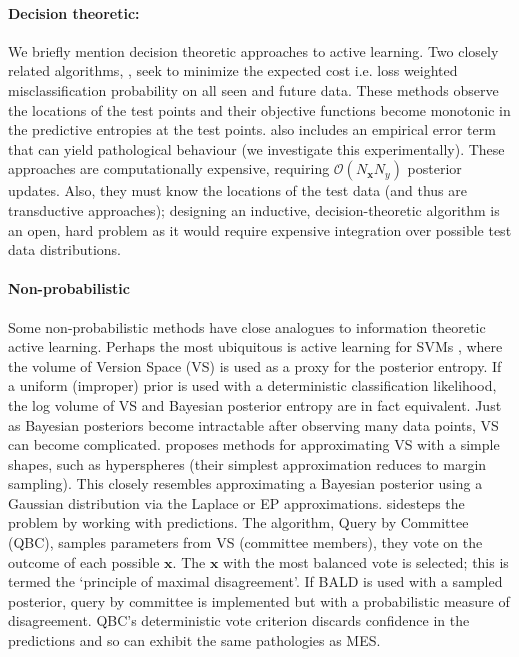 \documentclass[twoside]{article}
\newcommand{\x}{\bm{x}}
\newcommand{\y}{y}
\begin{document}
\paragraph{Decision theoretic:} We briefly mention decision theoretic approaches to active learning. Two closely related algorithms, \cite{kapoor2007, zhu2003}, seek to minimize the expected cost i.e. loss weighted misclassification probability on all seen and future data. These methods observe the locations of the test points and their objective functions become monotonic in the predictive entropies at the test points. \cite{kapoor2007} also includes an empirical error term that can yield pathological behaviour (we investigate this experimentally). These approaches are computationally expensive, requiring $\mathcal{O}(N_{\x}N_{\y})$ posterior updates. Also, they must know the locations of the test data (and thus are transductive approaches); designing an inductive, decision-theoretic algorithm  is an open, hard problem as it would require expensive integration over possible test data distributions.

\paragraph{Non-probabilistic} Some non-probabilistic methods have close analogues to information theoretic active learning. Perhaps the most ubiquitous is active learning for SVMs \cite{tong2001,seung1992}, where the volume of Version Space (VS) is used as a proxy for the posterior entropy. If a uniform (improper) prior is used with a deterministic classification likelihood, the log volume of VS and Bayesian posterior entropy are in fact equivalent. Just as Bayesian posteriors become intractable after observing many data points, VS can become complicated. \cite{tong2001} proposes methods for approximating VS with a simple shapes, such as hyperspheres (their simplest approximation reduces to margin sampling). This closely resembles approximating a Bayesian posterior using a Gaussian distribution via the Laplace or EP approximations. \cite{seung1992} sidesteps the problem by working with predictions. The algorithm, Query by Committee (QBC), samples parameters from VS (committee members), they vote on the outcome of each possible $\x$. The $\x$ with the most balanced vote is selected; this is termed the `principle of maximal disagreement'. If BALD is used with a sampled posterior, query by committee is implemented but with a probabilistic measure of disagreement. QBC's deterministic vote criterion discards confidence in the predictions and so can exhibit the same pathologies as MES.
\end{document}

